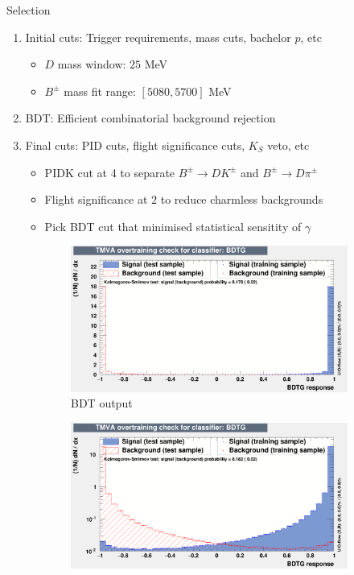 \documentclass{beamer}
\begin{document}
\begin{frame}{Selection}
  \begin{enumerate}
    \setlength\itemsep{1.0em}
    \item{Initial cuts: Trigger requirements, mass cuts, bachelor $p$, etc}
    \begin{itemize}
      \item{$D$ mass window: $25$ MeV}
      \item{$B^\pm$ mass fit range: $[5080, 5700]$ MeV}
    \end{itemize}
    \item{BDT: Efficient combinatorial background rejection}
    \item{Final cuts: PID cuts, flight significance cuts, $K_S$ veto, etc}
    \begin{itemize}
      \item{PIDK cut at 4 to separate $B^\pm\to DK^\pm$ and $B^\pm\to D\pi^\pm$}
      \item{Flight significance at $2$ to reduce charmless backgrounds}
      \item{Pick BDT cut that minimised statistical sensitity of $\gamma$}
    \end{itemize}
  \end{enumerate}
  \vspace{0.5cm}
  \begin{figure}
    \centering
    \vspace{-0.2cm}
    \begin{subfigure}{0.5\textwidth}
      \includegraphics[width = 1.0\textwidth]{Plots/overtrain_BDTG.png}
      \caption{BDT output}
    \end{subfigure}%
    \begin{subfigure}{0.5\textwidth}
      \includegraphics[width = 1.0\textwidth]{Plots/overtrain_BDTG_log.png}

\end{subfigure}
\end{figure}
\end{frame}
\end{document}
